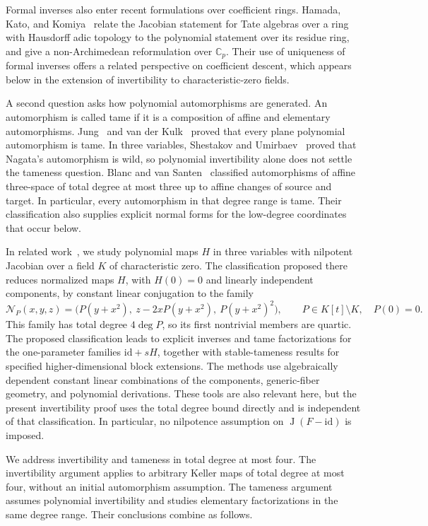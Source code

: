 \documentclass[11pt,reqno]{amsart}
\numberwithin{equation}{section}
\theoremstyle{plain}
\theoremstyle{definition}
\theoremstyle{remark}
\newcommand{\J}{\operatorname J}
\begin{document}
Formal inverses also enter recent formulations over coefficient rings.
Hamada, Kato, and Komiya~\cite{HKK25} relate the Jacobian statement for
Tate algebras over a ring with Hausdorff adic topology to the polynomial
statement over its residue ring, and give a non-Archimedean
reformulation over $\mathbb C_p$. Their use of uniqueness of formal
inverses offers a related perspective on coefficient descent, which
appears below in the extension of invertibility to characteristic-zero
fields.

A second question asks how polynomial automorphisms are generated.
An automorphism is called tame if it
is a composition of affine and elementary automorphisms. Jung~\cite{J}
and van der Kulk~\cite{K} proved that every plane polynomial automorphism
is tame. In three variables, Shestakov and Umirbaev~\cite{SU} proved that
Nagata's automorphism is wild, so polynomial invertibility alone does not
settle the tameness question. Blanc and van Santen~\cite{BVS} classified
automorphisms of affine three-space of total degree at most three up to
affine changes of source and target. In particular, every automorphism in
that degree range is tame. Their classification also supplies explicit
normal forms for the low-degree coordinates that occur below.

In related work~\cite{WY26}, we study polynomial maps $H$ in three
variables with nilpotent Jacobian over a field $K$ of characteristic zero.
The classification proposed there reduces normalized maps $H$, with
$H(0)=0$ and linearly independent components, by constant linear
conjugation to the family
\[
\mathcal N_P(x,y,z)
=\bigl(P(y+x^2),\ z-2xP(y+x^2),\ P(y+x^2)^2\bigr),
\qquad P\in K[t]\setminus K,\quad P(0)=0.
\]
This family has total degree $4\deg P$, so its first nontrivial members
are quartic. The proposed classification leads to explicit inverses and
tame factorizations for the one-parameter families $\mathrm{id}+sH$, together with
stable-tameness results for specified higher-dimensional block extensions.
The methods use algebraically dependent constant linear combinations of
the components, generic-fiber geometry, and polynomial derivations.
These tools are also relevant here, but the present invertibility proof
uses the total degree bound directly and is independent of that
classification. In particular, no nilpotence assumption on
$\J(F-\mathrm{id})$ is imposed.

We address invertibility and tameness in total degree at most four. The invertibility
argument applies to arbitrary Keller maps of total degree at most four,
without an initial automorphism assumption. The tameness argument assumes
polynomial invertibility and studies elementary factorizations in the same
degree range. Their conclusions combine as follows.
\end{document}
